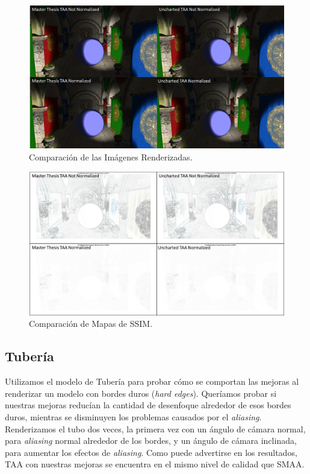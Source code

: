 \documentclass[pregrado]{tesis-usb} %
\begin{document}
\begin{figure}[!htb]
	\centering
	\includegraphics[scale=0.9]{images/results/sharpen_test_render.png}
	\caption{Comparación de las Imágenes Renderizadas.}\label{fig:sharpen_render}
\end{figure}

\begin{figure}[!htb]
	\centering
	\includegraphics[scale=0.9]{images/results/sharpen_test_ssim.png}
	\caption{Comparación de Mapas de SSIM.}\label{fig:sharpen_ssim}
\end{figure}

\FloatBarrier
\subsection{Tubería}
Utilizamos el modelo de Tubería para probar cómo se comportan las mejoras al renderizar un modelo con bordes duros (\textit{hard edges}).  Queríamos probar si nuestras mejoras reducían la cantidad de desenfoque alrededor de esos bordes duros, mientras se disminuyen los problemas causados por el \textit{aliasing}. Renderizamos el tubo dos veces, la primera vez con un ángulo de cámara normal, para \textit{aliasing} normal alrededor de los bordes, y un ángulo de cámara inclinada, para aumentar los efectos de \textit{aliasing}. Como puede advertirse en los resultados, TAA con nuestras mejoras se encuentra en el mismo nivel de calidad que SMAA.
\end{document}
